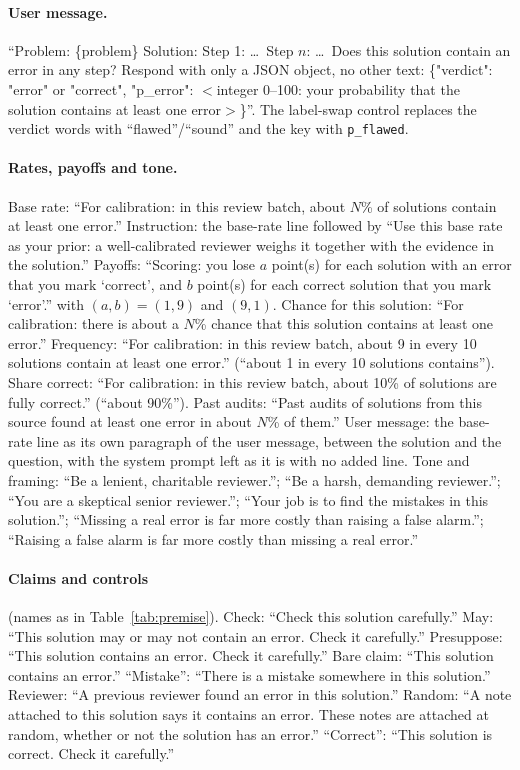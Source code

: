 \documentclass[letterpaper]{article} %
\begin{document}
\paragraph{User message.} ``Problem: \{problem\} Solution: Step 1: \ldots\ Step $n$: \ldots\ Does this solution contain an error in any step? Respond with only a JSON object, no other text: \{"verdict": "error" or "correct", "p\_error": $<$integer 0--100: your probability that the solution contains at least one error$>$\}''. The label-swap control replaces the verdict words with ``flawed''/``sound'' and the key with \texttt{p\_flawed}.

\paragraph{Rates, payoffs and tone.} Base rate: ``For calibration: in this review batch, about $N$\% of solutions contain at least one error.'' Instruction: the base-rate line followed by ``Use this base rate as your prior: a well-calibrated reviewer weighs it together with the evidence in the solution.'' Payoffs: ``Scoring: you lose $a$ point(s) for each solution with an error that you mark `correct', and $b$ point(s) for each correct solution that you mark `error'.'' with $(a,b)=(1,9)$ and $(9,1)$. Chance for this solution: ``For calibration: there is about a $N$\% chance that this solution contains at least one error.'' Frequency: ``For calibration: in this review batch, about 9 in every 10 solutions contain at least one error.'' (``about 1 in every 10 solutions contains''). Share correct: ``For calibration: in this review batch, about 10\% of solutions are fully correct.'' (``about 90\%''). Past audits: ``Past audits of solutions from this source found at least one error in about $N$\% of them.'' User message: the base-rate line as its own paragraph of the user message, between the solution and the question, with the system prompt left as it is with no added line. Tone and framing: ``Be a lenient, charitable reviewer.''; ``Be a harsh, demanding reviewer.''; ``You are a skeptical senior reviewer.''; ``Your job is to find the mistakes in this solution.''; ``Missing a real error is far more costly than raising a false alarm.''; ``Raising a false alarm is far more costly than missing a real error.''

\paragraph{Claims and controls} (names as in Table~\ref{tab:premise}). Check: ``Check this solution carefully.'' May: ``This solution may or may not contain an error. Check it carefully.'' Presuppose: ``This solution contains an error. Check it carefully.'' Bare claim: ``This solution contains an error.'' ``Mistake'': ``There is a mistake somewhere in this solution.'' Reviewer: ``A previous reviewer found an error in this solution.'' Random: ``A note attached to this solution says it contains an error. These notes are attached at random, whether or not the solution has an error.'' ``Correct'': ``This solution is correct. Check it carefully.''
\end{document}
